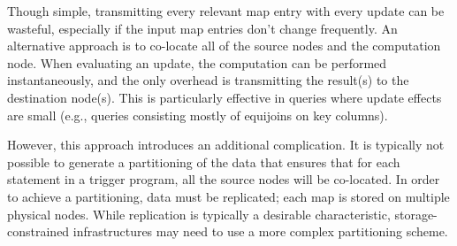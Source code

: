 Though simple, transmitting every relevant map entry with every update can be wasteful, especially if the input map entries don't change frequently.  An alternative approach is to co-locate all of the source nodes and the computation node.  When evaluating an update, the computation can be performed instantaneously, and the only overhead is transmitting the result(s) to the destination node(s).  This is particularly effective in queries where update effects are small (e.g., queries consisting mostly of equijoins on key columns).

However, this approach introduces an additional complication.  It is typically not possible to generate a partitioning of the data that ensures that for each statement in a trigger program, all the source nodes will be co-located.  In order to achieve a partitioning, data must be replicated; each map is stored on multiple physical nodes.  While replication is typically a desirable characteristic, storage-constrained infrastructures may need to use a more complex partitioning scheme.

